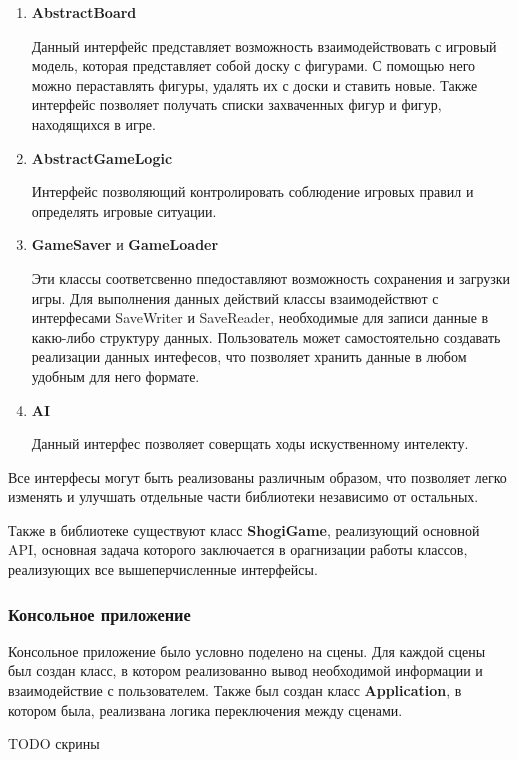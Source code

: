 	\begin{enumerate}
	\item \textbf{AbstractBoard}
	
	Данный интерфейс представляет возможность взаимодействовать с игровый модель, которая представляет собой доску с фигурами. С помощью него можно пераставлять фигуры, удалять их с доски и ставить новые. Также интерфейс позволяет получать списки захваченных фигур и фигур, находящихся в игре.  
	
	\item \textbf{AbstractGameLogic} 
	
	Интерфейс позволяющий контролировать соблюдение игровых правил и определять игровые ситуации. 
	
	\item \textbf{GameSaver} и \textbf{GameLoader}
	
	Эти классы соответсвенно ппедоставляют возможность сохранения и загрузки игры. Для выполнения данных действий классы взаимодействют с интерфесами SaveWriter и SaveReader, необходимые для записи данные в какю-либо структуру данных. Пользователь может самостоятельно создавать реализации данных интефесов, что позволяет хранить данные в любом удобным для него формате.
	
	\item \textbf{AI}
	
	Данный интерфес позволяет соверщать ходы искуственному интелекту.	
	\end{enumerate}

Все интерфесы могут быть реализованы различным образом, что позволяет легко изменять и улучшать отдельные части библиотеки независимо от остальных.

Также в библиотеке существуют класс \textbf{ShogiGame}, реализующий основной API, основная задача которого заключается в орагнизации работы классов, реализующих все вышеперчисленные интерфейсы.	
	
\subsubsection{Консольное приложение}

Консольное приложение было условно поделено на сцены. Для каждой сцены был создан класс, в котором реализованно вывод необходимой информации и взаимодействие с пользователем. Также был создан класс \textbf{Application}, в котором была, реализвана логика переключения между сценами.

TODO скрины 

